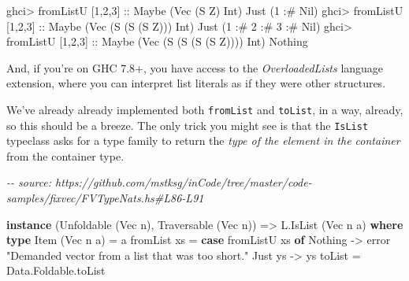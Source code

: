 \documentclass[]{article}
\newenvironment{Shaded}{}{}
\newcommand{\CommentTok}[1]{\textcolor[rgb]{0.38,0.63,0.69}{\textit{#1}}}
\newcommand{\DataTypeTok}[1]{\textcolor[rgb]{0.56,0.13,0.00}{#1}}
\newcommand{\DecValTok}[1]{\textcolor[rgb]{0.25,0.63,0.44}{#1}}
\newcommand{\FunctionTok}[1]{\textcolor[rgb]{0.02,0.16,0.49}{#1}}
\newcommand{\KeywordTok}[1]{\textcolor[rgb]{0.00,0.44,0.13}{\textbf{#1}}}
\newcommand{\NormalTok}[1]{#1}
\newcommand{\OperatorTok}[1]{\textcolor[rgb]{0.40,0.40,0.40}{#1}}
\newcommand{\OtherTok}[1]{\textcolor[rgb]{0.00,0.44,0.13}{#1}}
\newcommand{\StringTok}[1]{\textcolor[rgb]{0.25,0.44,0.63}{#1}}
\begin{document}
\begin{Shaded}
\begin{Highlighting}[]
\NormalTok{ghci}\OperatorTok{>}\NormalTok{ fromListU [}\DecValTok{1}\NormalTok{,}\DecValTok{2}\NormalTok{,}\DecValTok{3}\NormalTok{]}\OtherTok{ ::} \DataTypeTok{Maybe}\NormalTok{ (}\DataTypeTok{Vec}\NormalTok{ (}\DataTypeTok{S} \DataTypeTok{Z}\NormalTok{) }\DataTypeTok{Int}\NormalTok{)}
\DataTypeTok{Just}\NormalTok{ (}\DecValTok{1} \OperatorTok{:\#} \DataTypeTok{Nil}\NormalTok{)}
\NormalTok{ghci}\OperatorTok{>}\NormalTok{ fromListU [}\DecValTok{1}\NormalTok{,}\DecValTok{2}\NormalTok{,}\DecValTok{3}\NormalTok{]}\OtherTok{ ::} \DataTypeTok{Maybe}\NormalTok{ (}\DataTypeTok{Vec}\NormalTok{ (}\DataTypeTok{S}\NormalTok{ (}\DataTypeTok{S}\NormalTok{ (}\DataTypeTok{S} \DataTypeTok{Z}\NormalTok{))) }\DataTypeTok{Int}\NormalTok{)}
\DataTypeTok{Just}\NormalTok{ (}\DecValTok{1} \OperatorTok{:\#} \DecValTok{2} \OperatorTok{:\#} \DecValTok{3} \OperatorTok{:\#} \DataTypeTok{Nil}\NormalTok{)}
\NormalTok{ghci}\OperatorTok{>}\NormalTok{ fromListU [}\DecValTok{1}\NormalTok{,}\DecValTok{2}\NormalTok{,}\DecValTok{3}\NormalTok{]}\OtherTok{ ::} \DataTypeTok{Maybe}\NormalTok{ (}\DataTypeTok{Vec}\NormalTok{ (}\DataTypeTok{S}\NormalTok{ (}\DataTypeTok{S}\NormalTok{ (}\DataTypeTok{S}\NormalTok{ (}\DataTypeTok{S} \DataTypeTok{Z}\NormalTok{)))) }\DataTypeTok{Int}\NormalTok{)}
\DataTypeTok{Nothing}
\end{Highlighting}
\end{Shaded}

And, if you're on GHC 7.8+, you have access to the \emph{OverloadedLists}
language extension, where you can interpret list literals as if they were other
structures.

We've already already implemented both \texttt{fromList} and \texttt{toList}, in
a way, already, so this should be a breeze. The only trick you might see is that
the \texttt{IsList} typeclass asks for a type family to return the \emph{type of
the element in the container} from the container type.

\begin{Shaded}
\begin{Highlighting}[]
\CommentTok{{-}{-} source: https://github.com/mstksg/inCode/tree/master/code{-}samples/fixvec/FVTypeNats.hs\#L86{-}L91}

\KeywordTok{instance}\NormalTok{ (}\DataTypeTok{Unfoldable}\NormalTok{ (}\DataTypeTok{Vec}\NormalTok{ n), }\DataTypeTok{Traversable}\NormalTok{ (}\DataTypeTok{Vec}\NormalTok{ n)) }\OtherTok{=>} \DataTypeTok{L.IsList}\NormalTok{ (}\DataTypeTok{Vec}\NormalTok{ n a) }\KeywordTok{where}
    \KeywordTok{type} \DataTypeTok{Item}\NormalTok{ (}\DataTypeTok{Vec}\NormalTok{ n a) }\OtherTok{=}\NormalTok{ a}
\NormalTok{    fromList xs }\OtherTok{=} \KeywordTok{case}\NormalTok{ fromListU xs }\KeywordTok{of}
                    \DataTypeTok{Nothing} \OtherTok{{-}>} \FunctionTok{error} \StringTok{"Demanded vector from a list that was too short."}
                    \DataTypeTok{Just}\NormalTok{ ys }\OtherTok{{-}>}\NormalTok{ ys}
\NormalTok{    toList      }\OtherTok{=}\NormalTok{ Data.Foldable.toList}
\end{Highlighting}
\end{Shaded}
\end{document}
